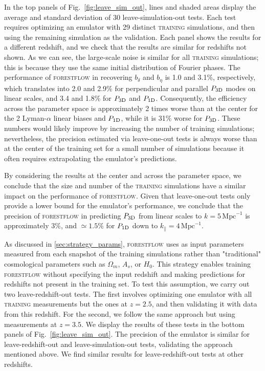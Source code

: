 \documentclass[fleqn,usenatbib]{mnras}
\newcommand{\lya}{Lyman-$\alpha$\xspace}
\newcommand{\poned}{\ensuremath{P_{\rm 1D}}\xspace}
\newcommand{\pthreed}{\ensuremath{P_{\rm 3D}}\xspace}
\newcommand{\forestflow}{\textsc{forestflow}\xspace}
\newcommand{\lacehc}{\textsc{training}\xspace}
\newcommand{\iMpc}{\ensuremath{\,\mathrm{Mpc}^{-1}}}
\begin{document}
In the top panels of Fig.~\ref{fig:leave_sim_out}, lines and shaded areas display the average and standard deviation of 30 leave-simulation-out tests. Each test requires optimizing an emulator with 29 distinct \lacehc simulations, and then using the remaining simulation as the validation. Each panel shows the results for a different redshift, and we check that the results are similar for redshifts not shown. As we can see, the large-scale noise is similar for all \lacehc simulations; this is because they use the same initial distribution of Fourier phases. The performance of \forestflow in recovering $b_\delta$ and $b_\eta$ is 1.0 and 3.1\%, respectively, which translates into 2.0 and 2.9\% for perpendicular and parallel \pthreed modes on linear scales, and 3.4 and 1.8\% for \pthreed and \poned. Consequently, the efficiency across the parameter space is approximately 2 times worse than at the center for the 2 \lya linear biases and \poned, while it is 31\% worse for \pthreed. These numbers would likely improve by increasing the number of training simulations; nevertheless, the precision estimated via leave-one-out tests is always worse than at the center of the training set for a small number of simulations because it often requires extrapolating the emulator's predictions.

By considering the results at the center and across the parameter space, we conclude that the size and number of the \lacehc simulations have a similar impact on the performance of \forestflow. Given that leave-one-out tests only provide a lower bound for the emulator's performance, we conclude that the precision of \forestflow in predicting \pthreed from linear scales to $k=5\iMpc$ is approximately 3\%, and $\simeq1.5\%$ for \poned down to $k_\parallel=4\iMpc$.

As discussed in \cref{sec:strategy_params}, \forestflow uses as input parameters measured from each snapshot of the training simulations rather than "traditional" cosmological parameters such as $\Omega_m$, $A_s$, or $H_0$. This strategy enables training \forestflow without specifying the input redshift and making predictions for redshifts not present in the training set. To test this assumption, we carry out two leave-redshift-out tests. The first involves optimizing one emulator with all \lacehc measurements but the ones at $z=2.5$, and then validating it with data from this redshift. For the second, we follow the same approach but using measurements at $z=3.5$. We display the results of these tests in the bottom panels of Fig.~\ref{fig:leave_sim_out}. The precision of the emulator is similar for leave-redshift-out and leave-simulation-out tests, validating the approach mentioned above. We find similar results for leave-redshift-out tests at other redshifts.
\end{document}
